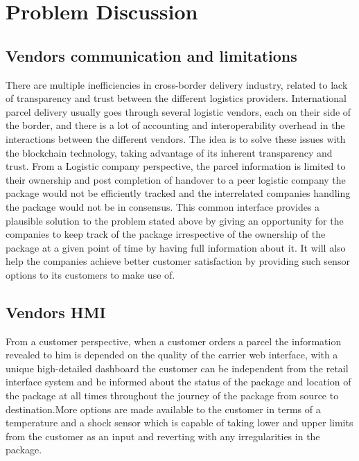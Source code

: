 \section{Problem Discussion}

\subsection{Vendors communication and limitations}
There are multiple inefficiencies in cross-border delivery industry, related to lack of transparency and trust between the different logistics providers. International parcel delivery usually goes through several logistic vendors, each on their side of the border, and there is a lot of accounting and interoperability overhead in the interactions between the different vendors. The idea is to solve these issues with the blockchain technology, taking advantage of its inherent transparency and trust.
From a Logistic company perspective, the parcel information is limited to their ownership and post completion of handover to a peer logistic company the package would not be efficiently tracked and the interrelated companies handling the package would not be in consensus. This common interface provides a plausible solution to the problem stated above by giving an opportunity for the companies to keep track of the package irrespective of the ownership of the package at a given point of time by having full information about it. It will also help the companies achieve better customer satisfaction by providing such sensor options to its customers to make use of.

\subsection{Vendors HMI}
From a customer perspective, when a customer orders a parcel the information revealed to him is depended on the quality of the carrier web interface, with a unique high-detailed dashboard the customer can be independent from the retail interface system and be informed about the status of the package and location of the package at all times throughout the journey of the package from source to destination.More options are made available to the customer in terms of a temperature and a shock sensor which is capable of taking lower and upper limits from the customer as an input and reverting with any irregularities in the package.

